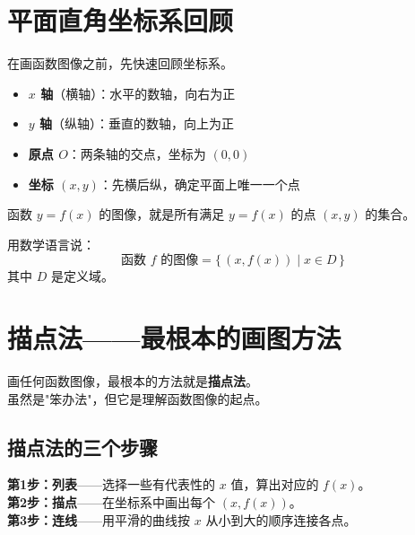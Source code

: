 \section{平面直角坐标系回顾}

在画函数图像之前，先快速回顾坐标系。

\begin{definitionbox}[平面直角坐标系]
\begin{itemize}
  \item \textbf{\(x\) 轴}（横轴）：水平的数轴，向右为正
  \item \textbf{\(y\) 轴}（纵轴）：垂直的数轴，向上为正
  \item \textbf{原点 \(O\)}：两条轴的交点，坐标为 \((0,0)\)
  \item \textbf{坐标 \((x, y)\)}：先横后纵，确定平面上唯一一个点
\end{itemize}
\end{definitionbox}

函数 \(y = f(x)\) 的图像，就是所有满足 \(y = f(x)\) 的点 \((x, y)\) 的集合。

用数学语言说：
\[
\text{函数 } f \text{ 的图像} = \{\, (x, f(x)) \mid x \in D \,\}
\]
其中 \(D\) 是定义域。


\section{描点法——最根本的画图方法}

画任何函数图像，最根本的方法就是\textbf{描点法}。\\
虽然是"笨办法"，但它是理解函数图像的起点。

\subsection{描点法的三个步骤}

\begin{definitionbox}[描点法画函数图像]
\textbf{第1步：列表}——选择一些有代表性的 \(x\) 值，算出对应的 \(f(x)\)。\\
\textbf{第2步：描点}——在坐标系中画出每个 \((x, f(x))\)。\\
\textbf{第3步：连线}——用平滑的曲线按 \(x\) 从小到大的顺序连接各点。
\end{definitionbox}

